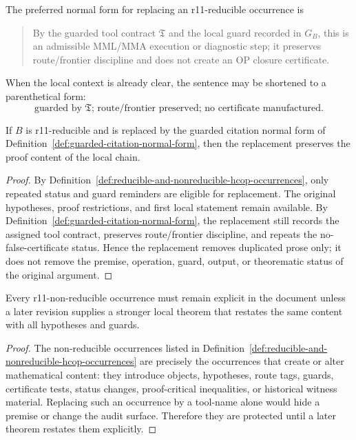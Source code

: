 \begin{definition}
\label{def:guarded-citation-normal-form}
The preferred normal form for replacing an r11-reducible occurrence is
\begin{quote}
\small
By the guarded tool contract \(\mathfrak T\) and the local guard recorded in \(G_B\), this is an admissible MML/MMA execution or diagnostic step; it preserves route/frontier discipline and does not create an OP closure certificate.
\end{quote}
When the local context is already clear, the sentence may be shortened to a parenthetical form:
\[
  \text{guarded by }\mathfrak T\text{; route/frontier preserved; no certificate manufactured.}
\]
\end{definition}

\begin{lemma}
\label{lem:guarded-reduction-preserves-proof-content}
If \(B\) is r11-reducible and is replaced by the guarded citation normal form of Definition~\ref{def:guarded-citation-normal-form}, then the replacement preserves the proof content of the local chain.
\end{lemma}

\begin{proof}
By Definition~\ref{def:reducible-and-nonreducible-hcop-occurrences}, only repeated status and guard reminders are eligible for replacement. The original hypotheses, proof restrictions, and first local statement remain available. By Definition~\ref{def:guarded-citation-normal-form}, the replacement still records the assigned tool contract, preserves route/frontier discipline, and repeats the no-false-certificate status. Hence the replacement removes duplicated prose only; it does not remove the premise, operation, guard, output, or theorematic status of the original argument.
\end{proof}

\begin{lemma}
\label{lem:nonreducible-occurrences-protect-theorematic-status}
Every r11-non-reducible occurrence must remain explicit in the document unless a later revision supplies a stronger local theorem that restates the same content with all hypotheses and guards.
\end{lemma}

\begin{proof}
The non-reducible occurrences listed in Definition~\ref{def:reducible-and-nonreducible-hcop-occurrences} are precisely the occurrences that create or alter mathematical content: they introduce objects, hypotheses, route tags, guards, certificate tests, status changes, proof-critical inequalities, or historical witness material. Replacing such an occurrence by a tool-name alone would hide a premise or change the audit surface. Therefore they are protected until a later theorem restates them explicitly.
\end{proof}

